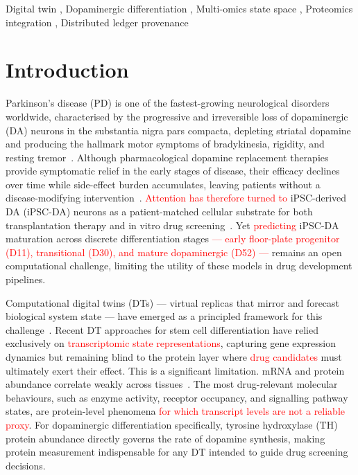 \documentclass[5p,times,twocolumn]{elsarticle}
\newcommand{\rtag}[1]{}
\newcommand{\rev}[2]{\rtag{#1}\textcolor{red}{#2}}
\newcommand{\lang}[1]{\textcolor{red}{#1}}
\begin{document}
\begin{frontmatter}
  \begin{keyword}
    Digital twin \sep
    Dopaminergic differentiation \sep
    Multi-omics state space \sep
    Proteomics integration \sep
    Distributed ledger provenance
  \end{keyword}

\end{frontmatter}

\section{Introduction}

Parkinson's disease (PD) is one of the fastest-growing
neurological disorders worldwide, characterised by the
progressive and irreversible loss of dopaminergic (DA)
neurons in the substantia nigra pars compacta,
depleting striatal dopamine and producing the hallmark
motor symptoms of bradykinesia, rigidity, and resting
tremor~\cite{jang2020current}.
Although pharmacological dopamine replacement therapies
provide symptomatic relief in the early stages of
disease, their efficacy declines over time while
side-effect burden accumulates, leaving patients without
a disease-modifying intervention~\cite{barker2024history}.
\lang{Attention has therefore turned to}
iPSC-derived DA (iPSC-DA) neurons as a patient-matched
cellular substrate for both transplantation therapy
and in vitro drug screening~\cite{oz2023neural}.
Yet \lang{predicting} iPSC-DA maturation
across discrete differentiation stages\rev{AC}{ ---
  early floor-plate progenitor (D11), transitional (D30),
  and mature dopaminergic (D52) ---} remains an open computational challenge,
limiting the utility of these models in drug
development pipelines.

Computational digital twins (DTs) --- virtual replicas
that mirror and forecast biological system state ---
have emerged as a principled framework for this
challenge~\cite{masison2021modular}.
Recent DT approaches for stem cell differentiation
have relied exclusively on \lang{transcriptomic state
  representations}, capturing gene expression dynamics
but remaining blind to the protein layer where \lang{drug
  candidates} must ultimately exert their effect.
This is a significant limitation. mRNA and protein abundance correlate weakly across tissues~\cite{kosti2016cross}. The most drug-relevant molecular behaviours, such as enzyme activity, receptor occupancy, and signalling pathway states, are protein-level phenomena \lang{for which transcript levels are not a reliable proxy}.
For dopaminergic differentiation specifically,
tyrosine hydroxylase (TH) protein abundance directly
governs the rate of dopamine synthesis, making protein
measurement indispensable for any DT intended to
guide drug screening decisions.
\end{document}
